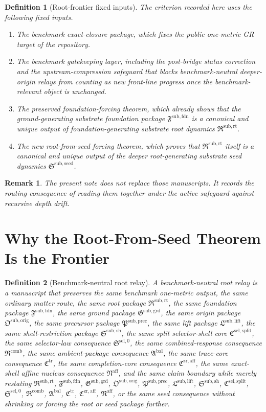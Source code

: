 \documentclass[11pt]{article}
\newcommand{\FoundationPackage}{\mathfrak F^{\mathrm{sub,fdn}}}
\newcommand{\GroundPackage}{\mathfrak G^{\mathrm{sub,grd}}}
\newcommand{\OriginPackage}{\mathfrak O^{\mathrm{sub,orig}}}
\newcommand{\PrecursorPackage}{\mathfrak P^{\mathrm{sub,prec}}}
\newcommand{\LiftPackage}{\mathfrak L^{\mathrm{sub,lift}}}
\newcommand{\ShellRestriction}{\mathfrak S^{\mathrm{sub,sh}}}
\newcommand{\SelectorCore}{\mathfrak C^{\mathrm{sel,split}}}
\newcommand{\SelectorLaw}{\mathfrak S^{\mathrm{sel},0}}
\newcommand{\CombinedLaw}{\mathfrak R^{\mathrm{comb}}}
\newcommand{\AmbientPackage}{\mathfrak A^{\mathrm{bal}}}
\newcommand{\TraceCore}{\mathfrak C^{\mathrm{tr}}}
\newcommand{\CompletionCore}{\mathfrak C^{\mathrm{zr,aff}}}
\newcommand{\AffineNucleus}{\mathfrak N^{\mathrm{aff}}}
\newcommand{\RootPackage}{\mathfrak R^{\mathrm{sub,rt}}}
\newcommand{\SeedPackage}{\mathfrak S^{\mathrm{sub,seed}}}
\newtheorem{definition}{Definition}
\newtheorem{remark}{Remark}
\begin{document}
\begin{definition}[Root-frontier fixed inputs]
The criterion recorded here uses the following fixed inputs.
\begin{enumerate}
    \item The benchmark exact-closure package, which fixes the public one-metric GR target of the repository.
    \item The benchmark gatekeeping layer, including the post-bridge status correction and the upstream-compression safeguard that blocks benchmark-neutral deeper-origin relays from counting as new front-line progress once the benchmark-relevant object is unchanged.
    \item The preserved foundation-forcing theorem, which already shows that the ground-generating substrate foundation package \(\FoundationPackage\) is a canonical and unique output of foundation-generating substrate root dynamics \(\RootPackage\).
    \item The new root-from-seed forcing theorem, which proves that \(\RootPackage\) itself is a canonical and unique output of the deeper root-generating substrate seed dynamics \(\SeedPackage\).
\end{enumerate}
\end{definition}

\begin{remark}
The present note does not replace those manuscripts. It records the routing consequence of reading them together under the active safeguard against recursive depth drift.
\end{remark}

\section{Why the Root-From-Seed Theorem Is the Frontier}

\begin{definition}[Benchmark-neutral root relay]
A \emph{benchmark-neutral root relay} is a manuscript that preserves the same benchmark one-metric output, the same ordinary matter route, the same root package \(\RootPackage\), the same foundation package \(\FoundationPackage\), the same ground package \(\GroundPackage\), the same origin package \(\OriginPackage\), the same precursor package \(\PrecursorPackage\), the same lift package \(\LiftPackage\), the same shell-restriction package \(\ShellRestriction\), the same split selector-shell core \(\SelectorCore\), the same selector-law consequence \(\SelectorLaw\), the same combined-response consequence \(\CombinedLaw\), the same ambient-package consequence \(\AmbientPackage\), the same trace-core consequence \(\TraceCore\), the same completion-core consequence \(\CompletionCore\), the same exact-shell affine nucleus consequence \(\AffineNucleus\), and the same claim boundary while merely restating \(\RootPackage\), \(\FoundationPackage\), \(\GroundPackage\), \(\OriginPackage\), \(\PrecursorPackage\), \(\LiftPackage\), \(\ShellRestriction\), \(\SelectorCore\), \(\SelectorLaw\), \(\CombinedLaw\), \(\AmbientPackage\), \(\TraceCore\), \(\CompletionCore\), \(\AffineNucleus\), or the same seed consequence without shrinking or forcing the root or seed package further.
\end{definition}
\end{document}
